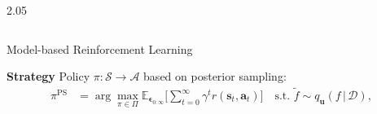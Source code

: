 \documentclass[final,12pt]{beamer}
\newlength{\colwidth}
\newcommand{\action}{\ensuremath{\mathbf{a}}}
\renewcommand{\mid}{\,|\,}
\newcommand{\state}{\ensuremath{\mathbf{s}}}
\newcommand{\noise}{\ensuremath{\bm\epsilon}}
\newcommand{\discount}{\ensuremath{\gamma}}
\newcommand{\dataset}{\ensuremath{\mathcal{D}}}
\newcommand{\stateDomain}{\ensuremath{\mathcal{S}}}
\newcommand{\actionDomain}{\ensuremath{\mathcal{A}}}
\newcommand{\rewardFn}{\ensuremath{r}}
\newcommand{\transitionFn}{\ensuremath{f}}
\newcommand{\policy}{\ensuremath{\pi}}
\begin{document}
\begin{frame}[t]
\begin{columns}[t]
\begin{column}{2.05\colwidth}
\begin{columns}[t]
\begin{column}{\colwidth}

    \begin{block}{Model-based Reinforcement Learning}


        \alert{\bf Strategy} Policy \(\pi : \stateDomain \rightarrow \actionDomain\) based on posterior sampling:
        \begin{align} \label{eq-posterior-sampling}
        \policy^{\text{PS}} &= \arg \max_{\pi \in \Pi} \mathbb{E}_{\noise_{0:\infty}} \bigg[ \sum_{t=0}^{\infty} \discount^{t} \rewardFn(\state_{t},\action_{t}) \bigg]
        \quad \text{s.t. } \tilde{\transitionFn} \sim q_{\mathbf{u}}({\transitionFn} \mid \dataset),
        \end{align}

        \newcommand{\lab}[1]{\protect\tikz[baseline=-.5ex]{\protect\node[minimum width=1.5em,minimum height=.8em,fill=#1,opacity=.1](a){};\protect\draw[#1,semithick](a.west)--(a.east);}}



\end{block}
\end{column}
\end{columns}
\end{column}
\end{columns}
\end{frame}
\end{document}
